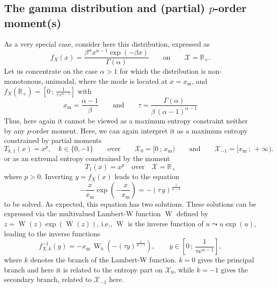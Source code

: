 \documentclass[entropy,article,submit,moreauthors,pdftex]{Definitions/mdpi}
\def\Rset{\mathbb{R}}
\def\X{\mathcal{X}}
\def\W{\operatorname{W}}
\begin{document}

\subsection{The gamma distribution and (partial) $p$-order moment(s)}

\label{subsec:GammaFirstOrder}

As a very special case, consider here this distribution, expressed as
%
\[
f_X(x) = \frac{\beta^\alpha  x^{\alpha-1} \exp(-\beta x)}{\Gamma(\alpha)} \qquad
\mbox{on} \qquad \X = \Rset_+.
\]
%
Let  us concentrate  on the  case $\alpha  > 1$  for which  the distribution  is
non-monotonous, unimodal, where the mode is located at $x = x_{\mathrm{m}}$, and
$f_X(\Rset_+) = \left[ 0 \, ; \, \frac1{\tau \,e^{\alpha-1}} \right]$ with
%
\[
x_{\mathrm{m}}  =   \frac{\alpha-1}{\beta}  \qquad  \mbox{and}  \qquad   \tau  =
\frac{\Gamma(\alpha)}{\beta \, (\alpha-1)^{\alpha-1}}
\]
%
Thus, here again it cannot be viewed  as a maximum entropy constraint neither by
any $p$-order  moment.  Here,  we can  again interpret it  as a  maximum entropy
constrained by partial moments
%
\[
T_{k,1}(x) = x^p, \quad k \in \{ 0 ,  -1 \} \qquad \mbox{over} \qquad \X_0 = [ 0
  \, ; \,  x_{\mathrm{m}} ) \qquad \mbox{and} \qquad \X_{-1}  = [ x_{\mathrm{m}}
    \, ; \: +\infty ).
\]
%
or as an extremal entropy constrained by the moment 
%
\[
T_1(x) = x^p \quad \mbox{over} \quad \X = \Rset_+
\]
%
where $p > 0$. Inverting $y = f_X(x)$ leads to the equation
%
\[
- \frac{x}{x_{\mathrm{m}}}  \exp\left( -  \frac{x}{x_{\mathrm{m}}}  \right) =  -
(\tau \, y )^{\frac{1}{\alpha - 1}}
\]
%
to be solved. As expected, this  equation has two solutions. These solutions can
be  expressed   via  the   multivalued  Lambert-W   function  $\W$   defined  by
$z=\W(z)\exp(\W(z))$,  i.e., $\W$  is  the  inverse function  of  $u \leadsto  u
\exp(u)$\cite[\S~1]{CorGon96}, leading to the inverse functions
%
\[
f_{X,k}^{-1}(y) = -  x_{\mathrm{m}} \, \W_k\left( -  (\tau y)^{\frac{1}{\alpha -
    1}} \right),  \qquad y \in  \left[ 0 \, ;  \, \frac{1}{\tau e^{\alpha  - 1}}
  \right],
\]
%
where  $k$  denotes the  branch  of  the  Lambert-W  function. $k=0$  gives  the
principal branch and here it is related  to the entropy part on $\X_0$, while $k
= -1$ gives the secondary branch, related to $\X_{-1}$ here.
\end{document}

